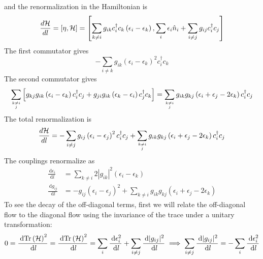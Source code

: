 \documentclass[12pt,twoside]{report}
\numberwithin{equation}{section}
\begin{document}
and the renormalization in the Hamiltonian is
\begin{equation}
	\frac{d\mathcal{H}}{dl} = \left[\eta, \mathcal{H}\right] = \left[\sum_{k\neq i} g_{ik}c^\dagger_i c_k \left(\epsilon_i - \epsilon_k\right), \sum_i \epsilon_i \hat n_i + \sum_{i\neq j} g_{ij}c^\dagger_i c_j\right]
\end{equation}
The  first commutator gives 
\begin{equation}
	-\sum_{i\neq k} g_{ik}\left(\epsilon_i - \epsilon_k\right)^2 c^\dagger_i c_k
\end{equation}
The second commutator gives
\begin{equation}
	\sum_{k\neq i\atop{j}}\left[g_{kj}g_{ik}\left(\epsilon_i - \epsilon_k\right) c^\dagger_i c_j + g_{ji}g_{ik}\left( \epsilon_k - \epsilon_i \right) c^\dagger_j c_k\right] = \sum_{k\neq i\atop{j}}g_{ik}g_{kj}\left( \epsilon_i + \epsilon_j - 2\epsilon_k \right) c^\dagger_i c_j
\end{equation}
The total renormalization is
\begin{equation}
	\frac{d\mathcal{H}}{dl} = -\sum_{i\neq j} g_{ij}\left(\epsilon_i - \epsilon_j\right)^2 c^\dagger_i c_j + \sum_{k\neq i\atop{j}}g_{ik}g_{kj}\left( \epsilon_i + \epsilon_j - 2\epsilon_k \right) c^\dagger_i c_j
\end{equation}
The couplings renormalize as
\begin{equation}\begin{aligned}
	\frac{\:\mathrm{d}\epsilon_i}{\:\mathrm{d}l} &= \sum_{k \neq i} 2|g_{ik}|^2\left( \epsilon_i - \epsilon_k \right)\\
	\frac{\:\mathrm{d}g_{ij}}{\:\mathrm{d}l} &= - g_{ij}\left(\epsilon_i - \epsilon_j\right)^2 + \sum_{k \neq i}g_{ik}g_{kj}\left( \epsilon_i + \epsilon_j - 2\epsilon_k \right)
\end{aligned}\end{equation}
To see the decay of the off-diagonal terms, first we will relate the off-diagonal flow to the diagonal flow using the invariance of the trace under a unitary transformation:
\begin{equation}\begin{aligned}
	0 = \frac{\:\mathrm{d}\text{Tr}\left( \mathcal{H} \right) ^2}{\:\mathrm{d}l} = \frac{\:\mathrm{d}\text{Tr}\left( \mathcal{H} \right) ^2}{\:\mathrm{d}l} = \sum_i \frac{\:\mathrm{d} \epsilon_i^2 }{\:\mathrm{d}l} + \sum_{i\neq j}\frac{\:\mathrm{d}|g_{ij}|^2}{\:\mathrm{d}l} \implies \sum_{i\neq j}\frac{\:\mathrm{d}|g_{ij}|^2}{\:\mathrm{d}l} = -\sum_i \frac{\:\mathrm{d} \epsilon_i^2 }{\:\mathrm{d}l}
\end{aligned}\end{equation}
\end{document}
